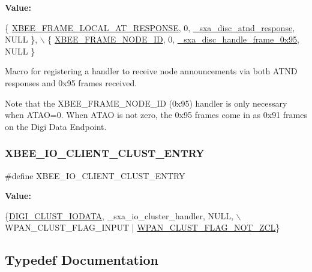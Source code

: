 {\bfseries Value\+:}
\begin{DoxyCode}
\{ \hyperlink{group__xbee__device_gga7753bbebaf00d6d64942f64b6ae9b7b9ae66771334070219cd098c8201936cf4a}{XBEE\_FRAME\_LOCAL\_AT\_RESPONSE}, 0, 
      \hyperlink{group___s_x_a_gaaa5cd9591d2c4735e4d9df944323ce17}{\_sxa\_disc\_atnd\_response}, NULL \},  \(\backslash\)
      \{ \hyperlink{group__xbee__device_gga7753bbebaf00d6d64942f64b6ae9b7b9a5b572839c3123f1059ec2ced643cf5d2}{XBEE\_FRAME\_NODE\_ID}, 0, \hyperlink{group___s_x_a_gadd7b9ea8d43a02a15c22957b936c8a71}{\_sxa\_disc\_handle\_frame\_0x95}, 
      NULL \}
\end{DoxyCode}


Macro for registering a handler to receive node announcements via both A\+T\+ND responses and 0x95 frames received. 

Note that the X\+B\+E\+E\+\_\+\+F\+R\+A\+M\+E\+\_\+\+N\+O\+D\+E\+\_\+\+ID (0x95) handler is only necessary when A\+T\+AO=0. When A\+T\+AO is not zero, the 0x95 frames come in as 0x91 frames on the Digi Data Endpoint. \mbox{\label{group___s_x_a_ga19c9d9c766179398cff4bf8b33f57ae9}} 
\subsubsection{\texorpdfstring{X\+B\+E\+E\+\_\+\+I\+O\+\_\+\+C\+L\+I\+E\+N\+T\+\_\+\+C\+L\+U\+S\+T\+\_\+\+E\+N\+T\+RY}{XBEE\_IO\_CLIENT\_CLUST\_ENTRY}}
{\footnotesize\ttfamily \#define X\+B\+E\+E\+\_\+\+I\+O\+\_\+\+C\+L\+I\+E\+N\+T\+\_\+\+C\+L\+U\+S\+T\+\_\+\+E\+N\+T\+RY}

{\bfseries Value\+:}
\begin{DoxyCode}
\{\hyperlink{group__wpan__aps_gga1227ab13b41d82d9c9c9080662f74cf7a66527ddc0653858888ce47c469c95349}{DIGI\_CLUST\_IODATA}, \_sxa\_io\_cluster\_handler, NULL,  \(\backslash\)
         WPAN\_CLUST\_FLAG\_INPUT | \hyperlink{group__wpan__aps_gacb0e365a8c5e72ee90be503513e7e630}{WPAN\_CLUST\_FLAG\_NOT\_ZCL}\}
\end{DoxyCode}


\subsection{Typedef Documentation}
\mbox{\label{group___s_x_a_gaaeb2977fc8c351b3edcf007c1effc374}} 
